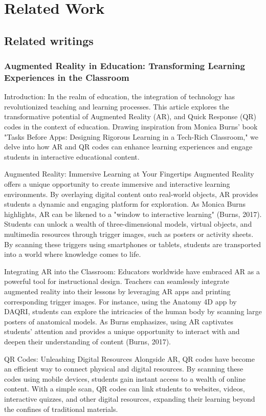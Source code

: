 \chapter{Related Work}\label{cap:relatedwork}
\section{Related writings}
\subsection{Augmented Reality in Education: Transforming Learning Experiences in the Classroom}
Introduction: In the realm of education, the integration of technology has revolutionized teaching and learning processes. This article explores the transformative potential of Augmented Reality (AR), and Quick Response (QR) codes in the context of education. Drawing inspiration from Monica Burns' book "Tasks Before Apps: Designing Rigorous Learning in a Tech-Rich Classroom," we delve into how AR and QR codes can enhance learning experiences and engage students in interactive educational content.

Augmented Reality: Immersive Learning at Your Fingertips Augmented Reality offers a unique opportunity to create immersive and interactive learning environments. By overlaying digital content onto real-world objects, AR provides students a dynamic and engaging platform for exploration. As Monica Burns highlights, AR can be likened to a "window to interactive learning" (Burns, 2017). Students can unlock a wealth of three-dimensional models, virtual objects, and multimedia resources through trigger images, such as posters or activity sheets. By scanning these triggers using smartphones or tablets, students are transported into a world where knowledge comes to life.

Integrating AR into the Classroom: Educators worldwide have embraced AR as a powerful tool for instructional design. Teachers can seamlessly integrate augmented reality into their lessons by leveraging AR apps and printing corresponding trigger images. For instance, using the Anatomy 4D app by DAQRI, students can explore the intricacies of the human body by scanning large posters of anatomical models. As Burns emphasizes, using AR captivates students' attention and provides a unique opportunity to interact with and deepen their understanding of content (Burns, 2017).

QR Codes: Unleashing Digital Resources Alongside AR, QR codes have become an efficient way to connect physical and digital resources. By scanning these codes using mobile devices, students gain instant access to a wealth of online content. With a simple scan, QR codes can link students to websites, videos, interactive quizzes, and other digital resources, expanding their learning beyond the confines of traditional materials.

